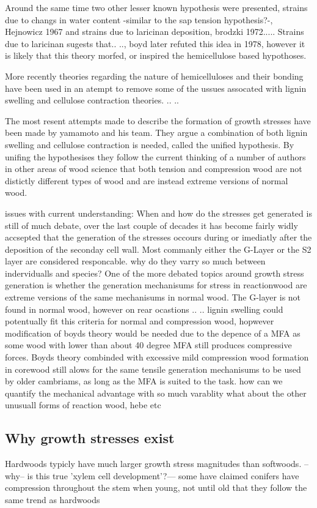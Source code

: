 \documentclass{article}
\begin{document}
Around the same time two other lesser known hypothesis were presented,  strains
due to changs in water content -similar to the sap tension hypothesis?-,
Hejnowicz 1967 and strains due to laricinan deposition, brodzki 1972.....
Strains due to laricinan sugests that.. .., boyd
later refuted this idea in 1978, however it is likely that this theory
morfed, or inspired the hemicellulose based hypothoses.

More recently theories regarding the nature of hemicelluloses and their bonding
have been used in an atempt to remove some of the ussues assocated with lignin
swelling and cellulose contraction theories. .. ..

The most resent attempts made to describe the formation of growth stresses have
been made by yamamoto and his team. They argue a combination of both lignin
swelling and cellulose contraction is needed, called the unified hypothesis.
By unifing the hypothesises they follow the current thinking of a number of
authors in other areas of wood science that both tension and compression wood
are not distictly different types of wood and are instead extreme versions of
normal wood.

issues with current understanding:
When and how do the stresses get generated is still of much debate, over the
last couple of decades it has become fairly widly accsepted that the generation
of the stresses occours during or imediatly after the deposition of the seconday
cell wall. Most commanly either the G-Layer or the S2 layer are considered
responcable.
why do they varry so much between indervidualls and species?
One of the more debated topics around growth stress generation is whether the
generation mechanisums for stress in reactionwood are extreme versions of the
same mechanisums in normal wood. The G-layer is not found in normal wood,
however on rear ocastions .. .. lignin swelling could potentually fit this
criteria for normal and compression wood, hopwever modification of boyds theory
would be needed due to the depence of a MFA as some wood with lower than about
40 degree MFA still produces compressive forces. Boyds theory combinded
with excessive mild compression wood formation in corewood still alows
for the same tensile generation mechanisums to be used by older cambriams, as
long as the MFA is suited to the task.
how can we quantify the mechanical advantage with so much varablity
what about the other unusuall forms of reaction wood, hebe etc


\subsection{Why growth stresses exist}
Hardwoods typicly have much larger growth stress magnitudes than softwoods.
--why-- is this true 'xylem cell development'?--- some have claimed conifers
have compression throughout the stem when young, not until old that they follow the same trend as
hardwoods
\end{document}
